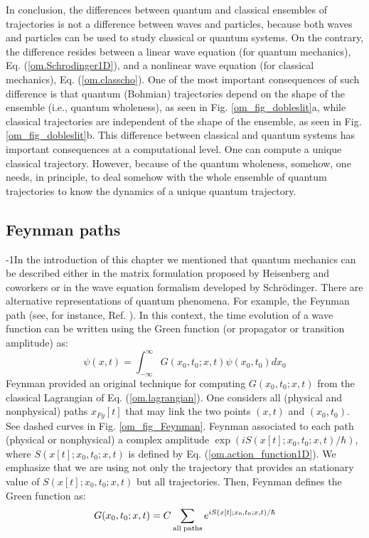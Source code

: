 \documentclass[nofootinbib, secnumarabic, amsmath, nobibnotes,10pt,aps,pra]{revtex4-1}
\newcommand{\fref}[1]{Fig. \ref{#1}}
\newcommand{\eref}[1]{Eq. (\ref{#1})}
\begin{document}
In conclusion, the differences between quantum and classical
ensembles of trajectories is not a difference between waves and
particles, because both waves and particles can be used to study
classical or quantum systems. On the contrary, the difference
resides between a linear wave equation (for quantum mechanics),
\eref{om.Schrodinger1D}, and a nonlinear wave equation (for
classical mechanics), \eref{om.classcho}. One of the most important
consequences of such difference is that quantum (Bohmian)
trajectories depend on the shape of the ensemble (i.e., quantum
wholeness), as seen in \fref{om_fig_dobleslit}a, while classical
trajectories are independent of the shape of the ensemble, as seen
in \fref{om_fig_dobleslit}b. This difference between classical and
quantum systems has important consequences at a computational level.
One can compute a unique classical trajectory. However, because of the quantum wholeness, somehow, one needs, in principle, to deal somehow with the whole ensemble of quantum
trajectories to know the dynamics of a unique quantum trajectory.

\subsection{Feynman paths}\label{om.sec_single.5}

\looseness-1In the introduction of this chapter we mentioned that quantum mechanics can be described either in the matrix formulation proposed by Heisenberg and coworkers or in the wave equation formalism developed by Schr\"odinger. There are alternative representations of quantum phenomena. For example, the Feynman path  (see, for instance, Ref. \cite{om.feynmann1965}). In this context, the time evolution of a wave function can be written using the Green function (or propagator or transition amplitude) as:
\begin{equation}
\label{om.Feynman1}
\psi(x,t) = \int_{-\infty}^{\infty} G(x_0,t_0;x,t) \psi(x_0,t_0) dx_0
\end{equation}
Feynman provided an original technique for computing 
$G(x_0,t_0;x,t)$ from the classical Lagrangian of
\eref{om.lagrangian}. One considers all (physical and nonphysical)
paths $x_{Fy}[t]$ that may link the two points $(x,t)$ and
$(x_0,t_0)$. See dashed curves in \fref{om_fig_Feynman}. Feynman
associated to each path (physical or nonphysical) a complex
amplitude $\exp(iS(x[t];x_0,t_0;x,t)/\hbar)$, where
$S(x[t];x_0,t_0;x,t)$ is defined by \eref{om.action_function1D}. We
emphasize that we are using not only the trajectory that provides an
stationary value of $S(x[t];x_0,t_0;x,t)$ but all trajectories.
Then, Feynman defines the Green function as:
\begin{equation}
\label{om.Feynman2}
G(x_0,t_0;x,t) = C\sum_{\rm all\;paths} e^{{i S(x[t];x_0,t_0;x,t)}/{\hbar}}
\end{equation}
\end{document}
